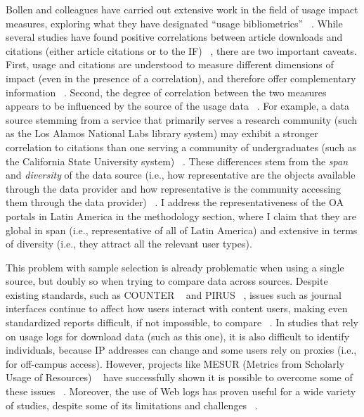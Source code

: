 Bollen and colleagues have carried out extensive work in the field of usage impact measures, exploring what they have designated ``usage bibliometrics'' ~\citep{Kurtz2010}. While several studies have found positive correlations between article downloads and citations (either article citations or to the IF) ~\citep{Moed2005,Bollen2005,Brody2006}, there are two important caveats. First, usage and citations are understood to measure different dimensions of impact (even in the presence of a correlation), and therefore offer complementary information ~\citep{Bollen2009}. Second, the degree of correlation between the two measures appears to be influenced by the source of the usage data ~\citep{Bollen2008a}. For example, a data source stemming from a service that primarily serves a research community (such as the Los Alamos National Labs library system) may exhibit a stronger correlation to citations than one serving a community of undergraduates (such as the California State University system) ~\citep{Bollen2008a}. These differences stem from the \emph{span} and \emph{diversity} of the data source (i.e., how representative are the objects available through the data provider and how representative is the community accessing them through the data provider) ~\citep{Bollen2008a}. I address the representativeness of the OA portals in Latin America in the methodology section, where I claim that they are global in span (i.e., representative of all of Latin America) and extensive in terms of diversity (i.e., they attract all the relevant user types).

This problem with sample selection is already problematic when using a single source, but doubly so when trying to compare data across sources. Despite existing standards, such as COUNTER ~\citep{COUNTER2012} and PIRUS ~\citep{Shepherd2011}, issues such as journal interfaces continue to affect how users interact with content users, making even standardized reports difficult, if not impossible, to compare ~\citep{Davis2006}. In studies that rely on usage logs for download data (such as this one), it is also difficult to identify individuals, because IP addresses can change and some users rely on proxies (i.e., for off-campus access). However, projects like MESUR (Metrics from Scholarly Usage of Resources) ~\citep{Bollen2007} have successfully shown it is possible to overcome some of these issues ~\citep{Bollen2008}. Moreover, the use of Web logs has proven useful for a wide variety of studies, despite some of its limitations and challenges ~\citep{Jamali2005}.


